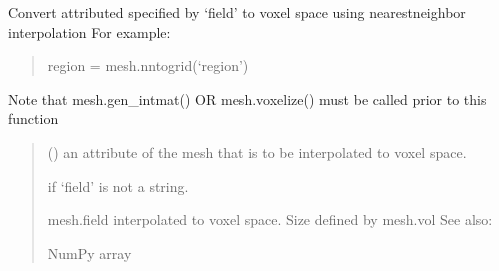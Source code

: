 \documentclass[letterpaper,10pt,english]{sphinxmanual}
\begin{document}
\begin{fulllineitems}
\begin{fulllineitems}
\begin{quote}
\begin{description}
\end{description}\end{quote}

\end{fulllineitems}


\begin{fulllineitems}
\label{\detokenize{_autosummary/nirfasterff.base.stnd_mesh.stndmesh:nirfasterff.base.stnd_mesh.stndmesh.nntogrid}}
\pysigstartsignatures
\pysiglinewithargsret
{}
{}
{}
\pysigstopsignatures
\sphinxAtStartPar
Convert attributed specified by ‘field’ to voxel space using nearest\sphinxhyphen{}neighbor interpolation
For example:
\begin{quote}

\sphinxAtStartPar
region = mesh.nntogrid(‘region’)
\end{quote}

\sphinxAtStartPar
Note that mesh.gen\_intmat() OR mesh.voxelize() must be called prior to this function
\begin{quote}\begin{description}
\sphinxAtStartPar
{} () \textendash{} an attribute of the mesh that is to be interpolated to voxel space.

\sphinxAtStartPar
{} \textendash{} if ‘field’ is not a string.

\sphinxAtStartPar
{} \textendash{} mesh.field interpolated to voxel space. Size defined by mesh.vol
See also: {\hyperref[\detokenize{_autosummary/nirfasterff.utils.nntogrid:nirfasterff.utils.nntogrid}]{}}

\sphinxAtStartPar
NumPy array

\end{description}\end{quote}

\end{fulllineitems}



\end{fulllineitems}
\end{document}

